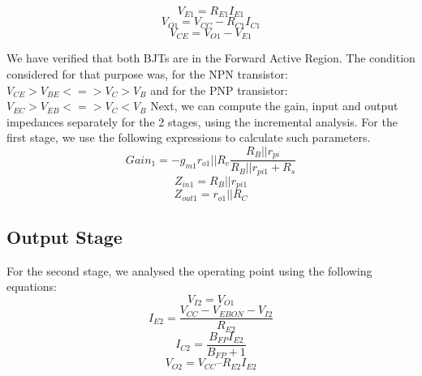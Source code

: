 \begin{equation}
	V_{E1} = {R_{E1}}{I_{E1}}
	\label{eq:V_E1}
\end{equation}
\begin{equation}
	V_{O1}=V_{CC}-{R_{C1}}{I_{C1}}
	\label{eq:V_O1}
\end{equation}
\begin{equation}
V_{CE}= V_{O1}-V_{E1}
	\label{eq:V_CE}
\end{equation}
 
\noindent We have verified that both BJTs are in the Forward Active Region. The condition considered for that purpose was, for the NPN transistor: $V_{CE} > V_{BE} <=> V_{C} > V_{B}$ and for the PNP transistor: $V_{EC} > V_{EB} <=> V_{C} < V_{B}$
\noindent Next, we can compute the gain, input and output impedances separately for the 2 stages, using the incremental analysis. For the first stage, we use the following expressions to calculate such parameters.
\begin{equation}
	Gain_{1} = - {g_{m1}}{r_{o1}||R_{c}} {\frac{R_{B}||r_{pi}}{R_{B}||r_{pi1}+R_{s}}} 
	\label{eq:gain_stage_gain}
\end{equation}
\begin{equation}
	Z_{in1} = R_{B} || r_{pi1}
	\label{eq:gain_stage_input_impedance}
\end{equation}
\begin{equation}
	Z_{out1} = r_{o1} || R_{C}
	\label{eq:gain_stage_output_impedance}
\end{equation}

\subsection{Output Stage}
\label{sec: output}
For the second stage, we analysed the operating point using the following equations:
\begin{equation}	
V_{I2} = V_{O1}
	\label{eq:V_I2}
\end{equation}
\begin{equation}	
I_{E2} = \frac{V_{CC}-V_{EBON}-V_{I2}}{R_{E2}}
	\label{eq:I_E2}
\end{equation}
\begin{equation}	
I_{C2} = \frac{{B_{FP}}{I_{E2}}}{B_{FP}+1}
	\label{eq:I_C2}
\end{equation}
\begin{equation}	
V_{O2} = V_{CC} – {R_{E2}}{I_{E2}}
	\label{eq:V_O2}
\end{equation}

